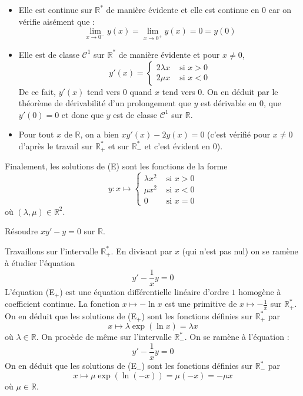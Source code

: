 \documentclass[a4paper,10pt]{report}
\begin{document}
\begin{itemize}
\item Elle est continue sur $\mathbb R^*$ de manière évidente et elle est continue en $0$ car on vérifie aisément que :
 $$\lim\limits_{x \to 0^-} y(x) = \lim\limits_{x \to 0^+} y(x) = 0 = y(0)$$
\item Elle est de classe $\mathcal C^1$ sur $\mathbb R^*$ de manière évidente et pour $x \neq 0$, 
$$y'(x) =  \left\{\begin{array}{ll} 2\lambda x & \text{ si } x > 0 \\ 2\mu x & \text{ si } x < 0 \end{array}\right.$$
De ce fait, $y'(x)$ tend vers $0$ quand $x$ tend vers $0$. On en déduit par le théorème de dérivabilité d'un prolongement que $y$ est dérivable en $0$, que $y'(0)=0$ et donc que $y$ est de classe $\mathcal C^1$ sur $\mathbb R$.
\item Pour tout $x$ de $\mathbb R$, on a bien $xy'(x) -2y(x) = 0$ (c'est vérifié pour $x \neq 0$ d'après le travail sur $\mathbb{R}_+^*$ et sur $\mathbb{R}_{-}^*$ et c'est évident en $0$).
\end{itemize}
Finalement, les solutions de (E) sont les fonctions de la forme
$$y  : x \mapsto \left\{\begin{array}{ll} \lambda x^2 & \text{ si } x > 0 \\ \mu x^2 & \text{ si } x < 0 \\   0 & \text{ si } x = 0\end{array}\right.$$
où $(\lambda,\mu) \in \mathbb R^2$.

\begin{Exercice}{} Résoudre $xy' -y = 0$ sur $\mathbb{R}$.
\end{Exercice}

\corr Travaillons sur l'intervalle $\mathbb R_+^*$. En divisant par $x$ (qui n'est pas nul) on se ramène à étudier l'équation
\begin{equation}
\tag{E$_+$}
y'  -\dfrac{1}{x}y = 0
\end{equation}
L'équation (E$_+$) est une équation différentielle  linéaire d'ordre $1$ homogène à coefficient continue. La fonction $x \mapsto -\ln x$ est une primitive de $x \mapsto - \frac{1}{x}$ sur $\mathbb R_+^*$. On en déduit que les solutions de (E$_+$) sont les fonctions définies sur $\mathbb R_+^*$ par 
$$x \mapsto \lambda \exp(\ln x) = \lambda x$$
où $\lambda  \in \mathbb R$. On procède de même sur l'intervalle $\mathbb R_-^*$. On se ramène à l'équation :
\begin{equation}
\tag{E$_-$}
y' -\dfrac{1}{x}y = 0
\end{equation}
On en déduit que les solutions de (E$_-$) sont les fonctions définies sur $\mathbb R_-^*$ par 
$$x \mapsto \mu\exp(\ln (-x)) = \mu(-x) = -\mu x$$
où $\mu \in \mathbb R$.
\end{document}

